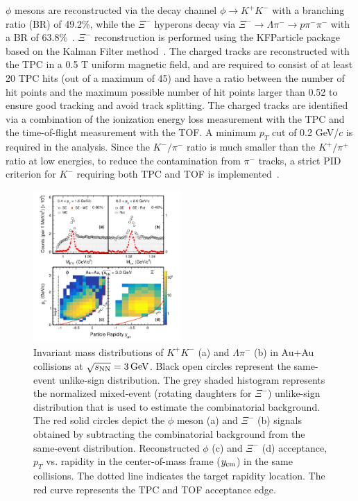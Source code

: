 \documentclass[aps,tightenlines,superscriptaddress,twocolumn]{revtex4-1}
\begin{document}
$\phi$ mesons are reconstructed via the decay channel $\phi\rightarrow K^+K^-$ with a branching ratio (BR) of 49.2\%, while the $\Xi^{-}$ hyperons decay via $\Xi^-\rightarrow \Lambda\pi^-\rightarrow p\pi^-\pi^-$ with a BR of 63.8\%~\cite{pdg}. $\Xi^-$ reconstruction is performed using the KFParticle package based on the Kalman Filter method~\cite{Kisel:2018nvd,STAR_PRL_Xi_Oemga_polarization}. The charged tracks are reconstructed with the TPC in a 0.5 T uniform magnetic field, and are required to consist of at least 20 TPC hits (out of a maximum of 45) and have a ratio between the number of hit points and the maximum possible number of hit points larger than 0.52 to ensure good tracking and avoid track splitting. %
The charged tracks are identified via a combination of the ionization energy loss %
measurement with the TPC and the time-of-flight %
measurement with the TOF. A minimum $p_T$ cut of 0.2 GeV/$c$ is required in the analysis.
Since the $K^{-}/\pi^{-}$ ratio is much smaller than the $K^{+}/\pi^{+}$ ratio at low energies, to reduce the contamination from $\pi^{-}$ tracks, a strict PID criterion for $K^{-}$ requiring both TPC and TOF is implemented~\cite{Xu:2008th,Shao:2005iu}.


\begin{figure}
\centering
\hspace*{-4mm}
\includegraphics[width=0.50\textwidth]{fig1_signal-eps-converted-to.pdf}
  \caption{Invariant mass distributions of $K^+K^-$ (a) and  $\Lambda\pi^-$ (b) in Au+Au collisions at ${\sqrt{s_{\rm NN}} = \rm{3\,GeV}}$. Black open circles represent the same-event unlike-sign distribution. The grey shaded histogram represents the normalized mixed-event (rotating daughters for $\Xi^-$) unlike-sign distribution that is used to estimate the combinatorial background. The red solid circles depict the $\phi$ meson (a) and $\Xi^-$ (b) signals obtained by subtracting the combinatorial background from the same-event distribution. Reconstructed $\phi$ (c) and $\Xi^-$ (d) acceptance, $p_T$ vs. rapidity in the center-of-mass frame ($y_{\rm cm}$) in the same collisions. The dotted line indicates the target rapidity location. The red curve represents the TPC and TOF acceptance edge.}
\label{fig:phiSignal} 
\end{figure}
\end{document}
